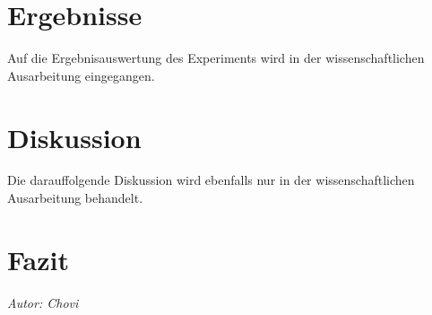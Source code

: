 \documentclass{Bericht}
\begin{document}
\section{Ergebnisse}
Auf die Ergebnisauswertung des Experiments wird in der wissenschaftlichen Ausarbeitung eingegangen.
\section{Diskussion}
Die darauffolgende Diskussion wird ebenfalls nur in der wissenschaftlichen Ausarbeitung behandelt.


\section{Fazit} %
\textit{Autor: Chovi}\\

\end{document}
